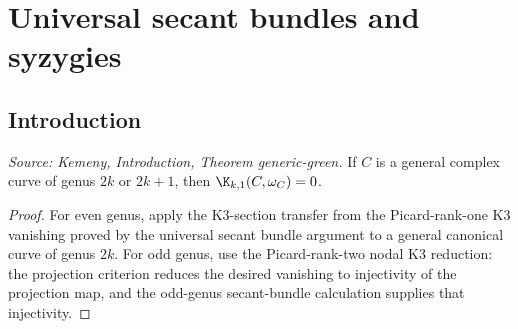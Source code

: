 \section{Universal secant bundles and syzygies}


\subsection{Introduction}

\begin{theorem}
  \label{thm:kemeny_generic_green}
  \textit{Source: Kemeny, Introduction, Theorem generic-green.}
  If \(C\) is a general complex curve of genus \(2k\) or \(2k+1\), then
  \(\K_{k,1}(C,\omega_C)=0\).
\end{theorem}
\begin{proof}
  For even genus, apply the K3-section transfer from the Picard-rank-one K3
  vanishing proved by the universal secant bundle argument to a general
  canonical curve of genus \(2k\).
  For odd genus, use the Picard-rank-two nodal K3 reduction: the projection
  criterion reduces the desired vanishing to injectivity of the projection map,
  and the odd-genus secant-bundle calculation supplies that injectivity.
\end{proof}

